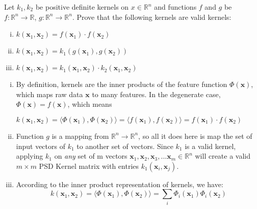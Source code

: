\begin{Parts}
\Part Let $ k_1, k_2 $ be positive definite kernels on $ x\in\mathbb{R}^{n} $ and functions $ f $ and $ g $ be $ f : \mathbb{R}^{n} \rightarrow \mathbb{R} $, $ g : \mathbb{R}^{n} \rightarrow \mathbb{R}^{n} $. Prove that the following kernels  are valid kernels:

\begin{enumerate}[i.]
  
\item $ k(\textbf{x}_1, \textbf{x}_2) = f(\textbf{x}_1)\cdot f(\textbf{x}_2) $
  
\item $ k(\textbf{x}_1, \textbf{x}_2) = k_1(g(\textbf{x}_1), g(\textbf{x}_2)) $

\item $ k(\textbf{x}_1, \textbf{x}_2) = k_1(\textbf{x}_1, \textbf{x}_2)\cdot k_2(\textbf{x}_1, \textbf{x}_2)$

\end{enumerate}

\begin{solution}

\begin{enumerate}[i.]
  
\item By definition, kernels are the inner products of the feature function $ \Phi(\textbf{x}) $, which maps raw data $\textbf{x} $ to many features. In the degenerate case, $ \Phi(\textbf{x}) = f(\textbf{x}) $, which means
\begin{center}
    $ k(\textbf{x}_1, \textbf{x}_2) = \langle \Phi(\textbf{x}_1), \Phi(\textbf{x}_2) \rangle = \langle f(\textbf{x}_1), f(\textbf{x}_2) \rangle = f(\textbf{x}_1)\cdot f(\textbf{x}_2) $
\end{center}
  
\item Function $ g $ is a mapping from $ \mathbb{R}^{n} \rightarrow \mathbb{R}^{n} $, so all it does here is map the set of input vectors of $k_1$ to another set of vectors. Since $k_1$ is a valid kernel, applying $ k_1 $ on \textit{any} set of m vectors $ \textbf{x}_1, \textbf{x}_2, \textbf{x}_3, ... \textbf{x}_m \in \mathbb{R}^{n} $ will create a valid $m \times m$ PSD Kernel matrix with entries $ k_1(\textbf{x}_i, \textbf{x}_j) $.

\item According to the inner product representation of kernels, we have:
$$ k(\textbf{x}_1, \textbf{x}_2) = \langle \Phi(\textbf{x}_1), \Phi(\textbf{x}_2) \rangle = \sum_{i} \Phi_i(\textbf{x}_1)\Phi_i(\textbf{x}_2)  $$


\end{enumerate}
\end{solution}
\end{Parts}
